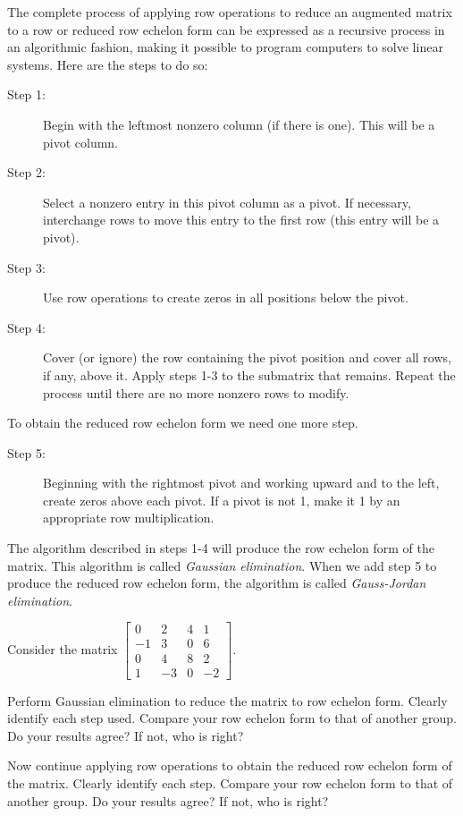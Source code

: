 The complete process of applying row operations to reduce an augmented matrix to a row or reduced row echelon form can be expressed as a recursive process in an algorithmic fashion, making it possible to program computers to solve linear systems. Here are the steps to do so: 

\begin{description}
\item[Step 1:] Begin with the leftmost nonzero column (if there is one). This will be a pivot column. 

\item[Step 2:] Select a nonzero entry in this pivot column as a pivot. If necessary, interchange rows to move this entry to the first row (this entry will be a pivot).

\item[Step 3:] Use row operations to create zeros in all positions below the pivot.

\item[Step 4:] Cover (or ignore) the row containing the pivot position and cover all rows, if any, above it. Apply steps 1-3 to the submatrix that remains. Repeat the process until there are no more nonzero rows to modify.
\end{description}

To obtain the reduced row echelon form we need one more step.

\begin{description}
\item[Step 5:] Beginning with the rightmost pivot and working upward and to the left, create zeros above each pivot. If a pivot is not 1, make it 1 by an appropriate row multiplication.
\end{description}

The algorithm described in steps 1-4 will produce the row echelon form of the matrix. This algorithm is called \emph{Gaussian elimination}. When we add step 5 to produce the reduced row echelon form, the algorithm is called \emph{Gauss-Jordan elimination}.



\begin{activity} \label{act:1_c_3} Consider the matrix $\left[ \begin {array}{rrcr} 0&2&4&1\\ -1&3&0&6 \\ 0&4&8&2\\ 1&-3&0&-2\end {array}  \right]$. 
	\ba
	\item Perform Gaussian elimination to reduce the matrix to row echelon form. Clearly identify each step used. Compare your row echelon form to that of another group. Do your results agree? If not, who is right?
	
	
	
	\item Now continue applying row operations to obtain the reduced row echelon form of the matrix. Clearly identify each step. Compare your row echelon form to that of another group. Do your results agree? If not, who is right?
	
	
	
	\ea
\end{activity}



